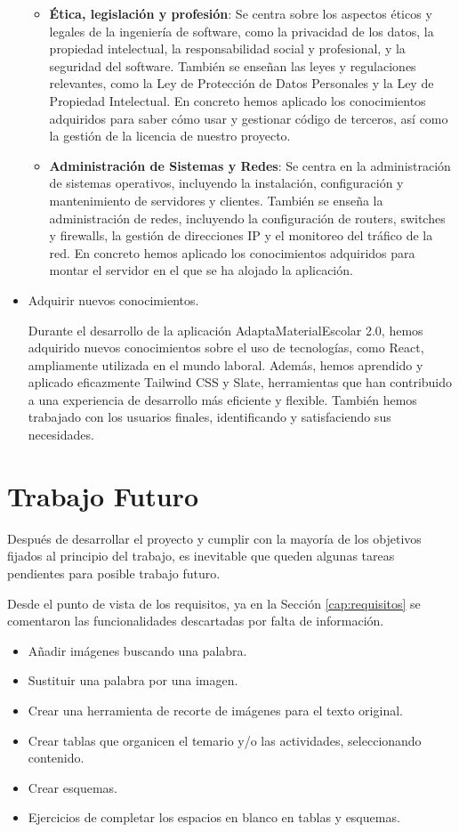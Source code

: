 \begin{itemize}
\begin{itemize}
        \item \textbf{Ética, legislación y profesión}: Se centra sobre los aspectos éticos y legales de la ingeniería de software, como la privacidad de los datos, la propiedad intelectual, la responsabilidad social y profesional, y la seguridad del software. También se enseñan las leyes y regulaciones relevantes, como la Ley de Protección de Datos Personales y la Ley de Propiedad Intelectual. En concreto hemos aplicado los conocimientos adquiridos para saber cómo usar y gestionar código de terceros, así como la gestión de la licencia de nuestro proyecto.
        \item \textbf{Administración de Sistemas y Redes}: Se centra en la administración de sistemas operativos, incluyendo la instalación, configuración y mantenimiento de servidores y clientes. También se enseña la administración de redes, incluyendo la configuración de routers, switches y firewalls, la gestión de direcciones IP y el monitoreo del tráfico de la red. En concreto hemos aplicado los conocimientos adquiridos para montar el servidor en el que se ha alojado la aplicación.
    \end{itemize}
    \item Adquirir nuevos conocimientos.

    Durante el desarrollo de la aplicación AdaptaMaterialEscolar 2.0, hemos adquirido nuevos conocimientos sobre el uso de tecnologías, como React, ampliamente utilizada en el mundo laboral. Además, hemos aprendido y aplicado eficazmente Tailwind CSS y Slate, herramientas que han contribuido a una experiencia de desarrollo más eficiente y flexible. También hemos trabajado con los usuarios finales, identificando y satisfaciendo sus necesidades.
 \end{itemize}




\section{Trabajo Futuro}
\label{sec:TrabajoFuturo}
Después de desarrollar el proyecto y cumplir con la mayoría de los objetivos fijados al principio del trabajo, es inevitable que queden algunas tareas pendientes para posible trabajo futuro.

Desde el punto de vista de los requisitos, ya en la Sección \ref{cap:requisitos} se comentaron las funcionalidades descartadas por falta de información.

\begin{itemize}
    \item Añadir imágenes buscando una palabra.
    \item Sustituir una palabra por una imagen.
    \item Crear una herramienta de recorte de imágenes para el texto original.
    \item Crear tablas que organicen el temario y/o las actividades, seleccionando contenido.
    \item Crear esquemas.
    \item Ejercicios de completar los espacios en blanco en tablas y esquemas.
\end{itemize}

